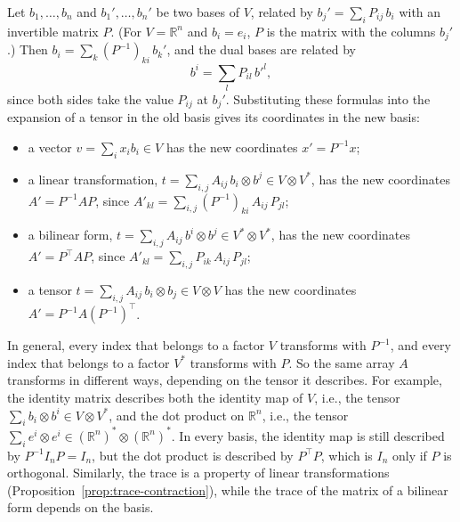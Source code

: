 \documentclass[11pt]{article}
\theoremstyle{definition}
\theoremstyle{plain}
\theoremstyle{remark}
\begin{document}
Let $b_1, \ldots, b_n$ and $b_1', \ldots, b_n'$ be two bases of $V$, related by $b_j' = \sum_i P_{ij}\, b_i$ with an invertible matrix $P$. (For $V = \mathbb{R}^n$ and $b_i = e_i$, $P$ is the matrix with the columns $b_j'$.) Then $b_i = \sum_k (P^{-1})_{ki}\, b_k'$, and the dual bases are related by
\[b^i = \sum_l P_{il}\, b'^l,\]
since both sides take the value $P_{ij}$ at $b_j'$. Substituting these formulas into the expansion of a tensor in the old basis gives its coordinates in the new basis:
\begin{itemize}
    \item a vector $v = \sum_i x_ib_i \in V$ has the new coordinates $x' = P^{-1}x$;
    \item a linear transformation, $t = \sum_{i,j} A_{ij}\, b_i \otimes b^j \in V \otimes V^*$, has the new coordinates $A' = P^{-1}AP$, since $A'_{kl} = \sum_{i,j} (P^{-1})_{ki}\, A_{ij}\, P_{jl}$;
    \item a bilinear form, $t = \sum_{i,j} A_{ij}\, b^i \otimes b^j \in V^* \otimes V^*$, has the new coordinates $A' = P^\top AP$, since $A'_{kl} = \sum_{i,j} P_{ik}\, A_{ij}\, P_{jl}$;
    \item a tensor $t = \sum_{i,j} A_{ij}\, b_i \otimes b_j \in V \otimes V$ has the new coordinates $A' = P^{-1}A(P^{-1})^\top$.
\end{itemize}
In general, every index that belongs to a factor $V$ transforms with $P^{-1}$, and every index that belongs to a factor $V^*$ transforms with $P$. So the same array $A$ transforms in different ways, depending on the tensor it describes. For example, the identity matrix describes both the identity map of $V$, i.e., the tensor $\sum_i b_i \otimes b^i \in V \otimes V^*$, and the dot product on $\mathbb{R}^n$, i.e., the tensor $\sum_i e^i \otimes e^i \in (\mathbb{R}^n)^* \otimes (\mathbb{R}^n)^*$. In every basis, the identity map is still described by $P^{-1}I_nP = I_n$, but the dot product is described by $P^\top P$, which is $I_n$ only if $P$ is orthogonal. Similarly, the trace is a property of linear transformations (Proposition~\ref{prop:trace-contraction}), while the trace of the matrix of a bilinear form depends on the basis.
\end{document}
